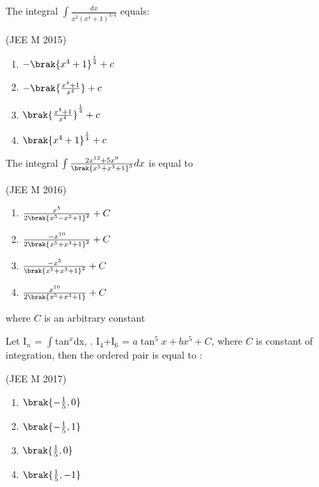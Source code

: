 	\item The integral $\int\frac{dx}{x^2(x^4+1)^{3/4}}$ equals:

		\hfill{(JEE M 2015)}

		\begin{multicols}{2}
			\begin{enumerate}
				\item $-\brak{x^4+1}^{\frac{1}{4}}+c$
				\item $-\brak{\frac{x^4+1}{x^4}}+c$
				\item $\brak{\frac{x^4+1}{x^4}}^{\frac{1}{4}}+c$
				\item $\brak{x^4+1}^{\frac{1}{4}}+c$
			\end{enumerate}
		\end{multicols}

	\item The integral $\int\frac{2x^{12}+5x^9}{\brak{x^5+x^3+1}^3}dx$ is equal to

		\hfill{(JEE M 2016)}

		\begin{multicols}{2}
			\begin{enumerate}
				\item $\frac{x^5}{2\brak{x^5-x^3+1}^2}+C$
				\item $\frac{-x^{10}}{2\brak{x^5+x^3+1}^2}+C$
				\item $\frac{-x^5}{\brak{x^5+x^3+1}^2}+C$
				\item $\frac{x^{10}}{2\brak{x^5+x^3+1}}+C$
			\end{enumerate}
		\end{multicols}
		where $C$ is an arbitrary constant

	\item Let I$_n$ = $\int$tan$^x$dx, . I$_4$+I$_6$ = $a \tan^5x + bx^5 + C$, where $C$ is constant of integration, then the ordered pair  is equal to :

		\hfill{(JEE M 2017)}

		\begin{multicols}{4}
			\begin{enumerate}
				\item$\brak{-\frac{1}{5}, 0}$
					
				\item$\brak{-\frac{1}{5}, 1}$
					
				\item$\brak{\frac{1}{5}, 0}$
					
				\item$\brak{\frac{1}{5}, -1}$
			\end{enumerate}
		\end{multicols}
		
